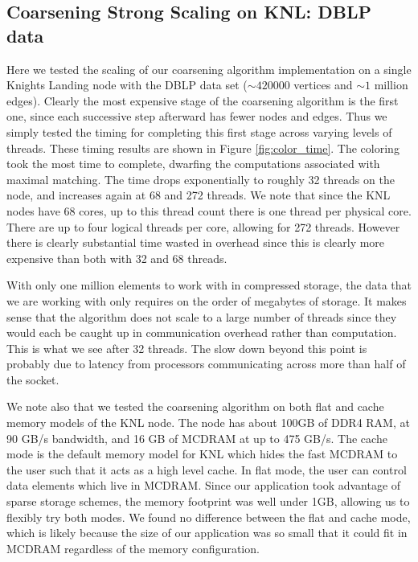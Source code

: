 \documentclass[11pt]{article}
\begin{document}
\subsection{Coarsening Strong Scaling on KNL: DBLP data}

Here we tested the scaling of our coarsening algorithm implementation on a single
Knights Landing node with the DBLP data set ($\sim 420000$ vertices and $\sim 1$
million edges). Clearly the most expensive stage of the coarsening algorithm is
the first one, since each successive step afterward has fewer nodes and edges.
Thus we simply tested the timing for completing this first stage across varying
levels of threads. These timing results are shown in Figure
\ref{fig:color_time}. The coloring took the most time to complete, dwarfing the
computations associated with maximal matching. The time drops exponentially to
roughly 32 threads on the node, and increases again at 68 and 272 threads. We
note that since the KNL nodes have 68 cores, up to this thread count there is
one thread per physical core. There are up to four logical threads per core,
allowing for 272 threads. However there is clearly substantial time wasted in
overhead since this is clearly more expensive than both with 32 and 68 threads.

With only one million elements to work with in compressed storage, the data that
we are working with only requires on the order of megabytes of storage. It makes
sense that the algorithm does not scale to a large number of threads since they
would each be caught up in communication overhead rather than computation. This
is what we see after 32 threads. The slow down beyond this point is probably due
to latency from processors communicating across more than half of the socket.

We note also that we tested the coarsening algorithm on both flat and cache
memory models of the KNL node. The node has about 100GB of DDR4 RAM, at 90 GB/s
bandwidth, and 16 GB of MCDRAM at up to 475 GB/s. The cache mode is the default
memory model for KNL which hides the fast MCDRAM to the user such that it acts
as a high level cache. In flat mode, the user can control data elements which
live in MCDRAM. Since our application took advantage of sparse storage schemes,
the memory footprint was well under 1GB, allowing us to flexibly try both modes.
We found no difference between the flat and cache mode, which is likely because
the size of our application was so small that it could fit in MCDRAM regardless
of the memory configuration.
\end{document}
